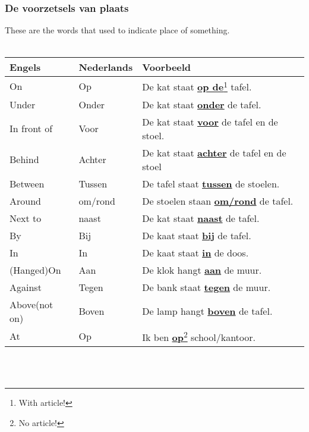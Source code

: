 \documentclass[a4paper,14pt]{extarticle}
\newcommand{\note}[2]{\underline{\textbf{#1}}\footnote{#2}}
\newcommand{\emp}[1]{\underline{\textbf{#1}}}
\begin{document}
\subsubsection{De voorzetsels van plaats}
These are the words that used to indicate place of something. \\ \\
\begin{tabularx}{\textwidth}{ p{} p{} p{} }
 \hline
 Engels & Nederlands & Voorbeeld\\
 \hline
 On & Op & De kat staat \note{op de}{With article!} tafel. \\
 Under & Onder & De kat staat \emp{onder} de tafel.\\
 In front of & Voor & De kat staat \emp{voor} de tafel en de stoel.\\
 Behind & Achter & De kat staat \emp{achter} de tafel en de stoel\\
 Between & Tussen & De tafel staat \emp{tussen} de stoelen.\\
 Around & om/rond & De stoelen staan \emp{om/rond} de tafel.\\
 Next to & naast & De kat staat \emp{naast} de tafel.\\
 By & Bij & De kaat staat \emp{bij} de tafel.\\
 In & In & De kaat staat \emp{in} de doos.\\
 (Hanged)On & Aan & De klok hangt \emp{aan} de muur.\\
 Against & Tegen & De bank staat \emp{tegen} de muur.\\
 Above(not on) & Boven & De lamp hangt \emp{boven} de tafel.\\
 At & Op & Ik ben \note{op}{No article!} school/kantoor.
\end{tabularx} \\ 
\hfill \\
\end{document}

